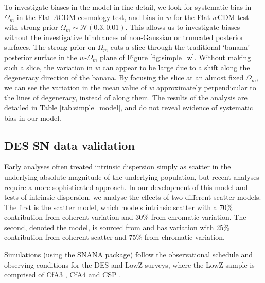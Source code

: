 \documentclass[a4paper,fleqn,usenatbib]{mnras}
\newcommand{\gten}{\citetalias{Guy2010}}
\newcommand{\celeven}{\citetalias{Chotard2011}}
\begin{document}
To investigate biases in the model in fine detail, we look for systematic bias in $\Omega_m$ in the Flat $\Lambda$CDM cosmology test, and bias in $w$ for the Flat $w$CDM test with strong prior $\Omega_m \sim \mathcal{N}(0.3, 0.01)$. This allows us to investigate biases without the investigative hindrances of non-Gaussian or truncated posterior surfaces. The strong prior on $\Omega_m$ cuts a slice through the traditional `banana' posterior surface in the $w$-$\Omega_m$ plane of Figure \ref{fig:simple_w}. Without making such a slice, the variation in $w$ can appear to be large due to a shift along the degeneracy direction of the banana. By focusing the slice at an almost fixed $\Omega_m$, we can see the variation in the mean value of $w$ approximately perpendicular to the lines of degeneracy, instead of along them. The results of the analysis are detailed in Table \ref{tab:simple_model}, and do not reveal evidence of systematic bias in our model.




















\subsection{DES SN data validation}
\label{sec:simdes}

Early analyses often treated intrinsic dispersion simply as scatter in the underlying absolute magnitude of the underlying population, but recent analyses require a more sophisticated approach. In our development of this model and tests of intrinsic dispersion, we analyse the effects of two different scatter models. The first is the \citet[][hereafter denoted {\gten}]{Guy2010} scatter model, which models intrinsic scatter with a 70\% contribution from coherent variation and 30\% from chromatic variation. The second, denoted the {\celeven} model, is sourced from \citet{Chotard2011} and has variation with 25\% contribution from coherent scatter and 75\% from chromatic variation. 

Simulations (using the SNANA package) follow the observational schedule and observing conditions for the DES and LowZ surveys, where the LowZ sample is comprised of CfA3 \citep{Hicken2009, Hicken2009a}, CfA4 \citep{Hicken2012} and CSP \citep{Contreras2010,Folatelli2010,Stritzinger2011}.
\end{document}
